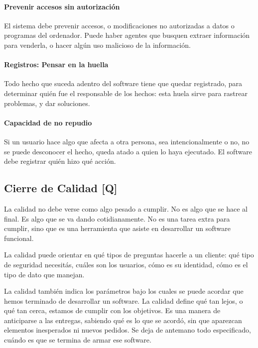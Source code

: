 \hypertarget{noaccess}{%
\paragraph{Prevenir accesos sin autorización}\label{noaccess}}
  El sistema debe prevenir
  accesos, o modificaciones no autorizadas a datos o programas del
  ordenador. Puede haber agentes que busquen extraer información para
  venderla, o hacer algún uso malicioso de la información.

\hypertarget{huellas}{%
\paragraph{Registros: Pensar en la huella}\label{huellas}}
 Todo hecho que suceda adentro
  del software tiene que quedar registrado, para determinar quién fue el
  responsable de los hechos: esta huela sirve para rastrear problemas, y
  dar soluciones.

\hypertarget{norepudio}{%
\paragraph{Capacidad de no repudio}\label{norepudio}}
  Si un usuario hace algo que afecta a
  otra persona, sea intencionalmente o no, no se puede desconocer el
  hecho, queda atado a quien lo haya ejecutado. El software debe
  registrar quién hizo qué acción.


\hypertarget{cierre-de-calidad-q}{%
\subsection{Cierre de Calidad {[}Q{]}}\label{cierre-de-calidad-q}}

La calidad no debe verse como algo pesado a cumplir. No es algo que se
hace al final. Es algo que se va dando cotidianamente. No es una tarea
extra para cumplir, sino que es una herramienta que asiste en
desarrollar un software funcional.

La calidad puede orientar en qué tipos de preguntas hacerle a un
cliente: qué tipo de seguridad necesitás, cuáles son los usuarios, cómo
es su identidad, cómo es el tipo de dato que manejan.

La calidad también indica los parámetros bajo los cuales se puede
acordar que hemos terminado de desarrollar un software. La calidad
define qué tan lejos, o qué tan cerca, estamos de cumplir con los
objetivos. Es una manera de anticiparse a las entregas, sabiendo qué es
lo que se acordó, sin que aparezcan elementos inesperados ni nuevos
pedidos. Se deja de antemano todo especificado, cuándo es que se termina
de armar ese software.

\onecolumn
